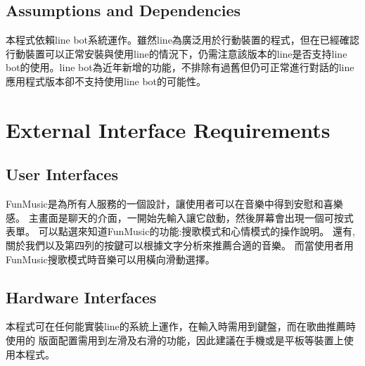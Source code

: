 \documentclass{scrreprt}
\begin{document}
\section{Assumptions and Dependencies}
\begin{CJK}{UTF8}{<font>}
本程式依賴line bot系統運作。雖然line為廣泛用於行動裝置的程式，但在已經確認行動裝置可以正常安裝與使用line的情況下，仍需注意該版本的line是否支持line bot的使用。line bot為近年新增的功能，不排除有過舊但仍可正常進行對話的line應用程式版本卻不支持使用line bot的可能性。
\end{CJK}

\chapter{External Interface Requirements}

\section{User Interfaces}
\begin{CJK}{UTF8}{<font>}
FunMusic是為所有人服務的一個設計，讓使用者可以在音樂中得到安慰和喜樂感。
主畫面是聊天的介面，一開始先輸入讓它啟動，然後屏幕會出現一個可按式表單。
可以點選來知道FunMusic的功能:搜歌模式和心情模式的操作說明。
還有,關於我們以及第四列的按鍵可以根據文字分析來推薦合適的音樂。
而當使用者用FunMusic搜歌模式時音樂可以用橫向滑動選擇。
\end{CJK}

\section{Hardware Interfaces}
\begin{CJK}{UTF8}{<font>}
本程式可在任何能實裝line的系統上運作，在輸入時需用到鍵盤，而在歌曲推薦時使用的
版面配置需用到左滑及右滑的功能，因此建議在手機或是平板等裝置上使用本程式。
\end{CJK}
\end{document}
